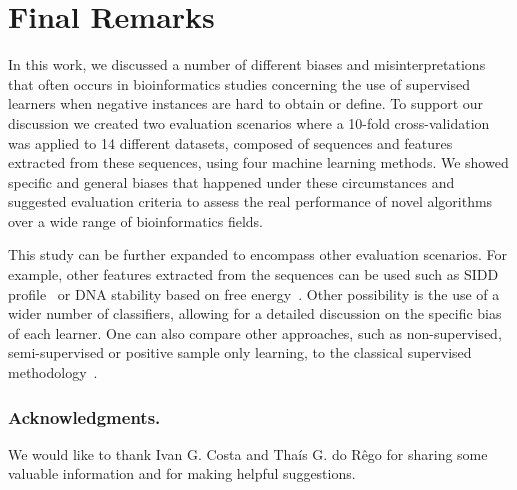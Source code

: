 \documentclass{sig-alternate}
\theoremstyle{plain}
\begin{document}
\section{Final Remarks}
\label{sec:final}

In this work, we discussed a number of different biases and misinterpretations that often occurs in bioinformatics studies concerning the use of supervised learners when negative instances are hard to obtain or define. To support our discussion we created two evaluation scenarios where a 10-fold cross-validation was applied to 14 different datasets, composed of sequences and features extracted from these sequences, using four machine learning methods. We showed specific and general biases that happened under these circumstances and suggested evaluation criteria to assess the real performance of novel algorithms over a wide range of bioinformatics fields.

This study can be further expanded to encompass other evaluation scenarios. For example, other features extracted from the sequences can be used such as SIDD profile~\cite{bland2010} or DNA stability based on free energy~\cite{avila2011}. Other possibility is the use of a wider number of classifiers, allowing for a detailed discussion on the specific bias of each learner. One can also compare other approaches, such as non-supervised, semi-supervised or positive sample only learning,  to the classical supervised methodology~\cite{cerulo2010,wang2006,yousef2008}.

\subsubsection*{Acknowledgments.} We would like to thank Ivan G. Costa and Tha\'{i}s G. do R\^{e}go for sharing some valuable information and for making helpful suggestions.

\vspace{0.5cm}


\end{document}
